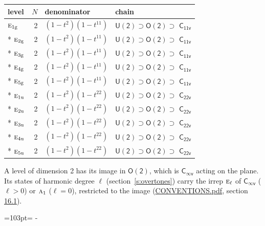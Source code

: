 \documentclass[10pt,a4paper]{article}
\newcommand{\needspace}[1]{\par\penalty-100\begingroup\dimen0=#1\relax\dimen2=\pagegoal
  \advance\dimen2-\pagetotal\ifdim\dimen0>\dimen2\relax\ifdim\dimen2>0pt\vfil\break\fi\fi
  \endgroup}
\numberwithin{equation}{section}
\newcommand{\grp}[1]{\mathsf{#1}}
\newcommand{\irr}[1]{\text{\normalfont\scshape #1}}
\newcommand{\ptag}[1]{\mathrm{#1}}
\begin{document}
{\small\begin{longtable}{@{}lrll@{}}\toprule
level & $N$ & denominator & chain\\\midrule\endhead
\bottomrule\endfoot\endlastfoot
$\irr{e}_{1\ptag{g}}$ & 2 & $(1-t^{2})(1-t^{11})$ & $\grp{U(2)} \supset \grp{O(2)} \supset$ \href{C11v.pdf}{$\grp{C_{11v}}$}\\*
$\irr{e}_{2\ptag{g}}$ & 2 & $(1-t^{2})(1-t^{11})$ & $\grp{U(2)} \supset \grp{O(2)} \supset$ \href{C11v.pdf}{$\grp{C_{11v}}$}\\*
$\irr{e}_{3\ptag{g}}$ & 2 & $(1-t^{2})(1-t^{11})$ & $\grp{U(2)} \supset \grp{O(2)} \supset$ \href{C11v.pdf}{$\grp{C_{11v}}$}\\*
$\irr{e}_{4\ptag{g}}$ & 2 & $(1-t^{2})(1-t^{11})$ & $\grp{U(2)} \supset \grp{O(2)} \supset$ \href{C11v.pdf}{$\grp{C_{11v}}$}\\*
$\irr{e}_{5\ptag{g}}$ & 2 & $(1-t^{2})(1-t^{11})$ & $\grp{U(2)} \supset \grp{O(2)} \supset$ \href{C11v.pdf}{$\grp{C_{11v}}$}\\*
$\irr{e}_{1\ptag{u}}$ & 2 & $(1-t^{2})(1-t^{22})$ & $\grp{U(2)} \supset \grp{O(2)} \supset$ $\grp{C_{22v}}$\\*
$\irr{e}_{2\ptag{u}}$ & 2 & $(1-t^{2})(1-t^{22})$ & $\grp{U(2)} \supset \grp{O(2)} \supset$ $\grp{C_{22v}}$\\*
$\irr{e}_{3\ptag{u}}$ & 2 & $(1-t^{2})(1-t^{22})$ & $\grp{U(2)} \supset \grp{O(2)} \supset$ $\grp{C_{22v}}$\\*
$\irr{e}_{4\ptag{u}}$ & 2 & $(1-t^{2})(1-t^{22})$ & $\grp{U(2)} \supset \grp{O(2)} \supset$ $\grp{C_{22v}}$\\*
$\irr{e}_{5\ptag{u}}$ & 2 & $(1-t^{2})(1-t^{22})$ & $\grp{U(2)} \supset \grp{O(2)} \supset$ $\grp{C_{22v}}$\\
\bottomrule\end{longtable}}
A level of dimension 2 has its image in $\grp{O(2)}$, which is \href{Cinfv.pdf}{$\grp{C_{\infty v}}$} acting on the plane. \label{n:index.harmonic.degree}Its states of harmonic degree $\ell$ (section~\ref{s:overtones}) carry the irrep $\irr{e}_{\ell}$ of \href{Cinfv.pdf}{$\grp{C_{\infty v}}$} ($\ell > 0$) or $\irr{a}_{1}$ ($\ell = 0$), restricted to the image (\href{../../CONVENTIONS.pdf}{CONVENTIONS.pdf}, section \href{../../CONVENTIONS.pdf\#conv.16.1}{16.1}).
\needspace{103pt}
\end{document}
